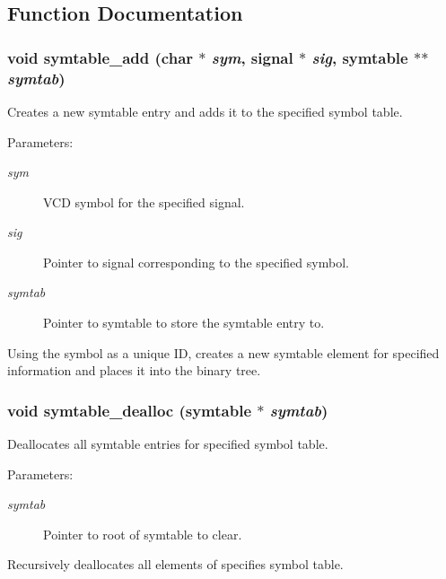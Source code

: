 \subsection{Function Documentation}
\subsubsection{\setlength{\rightskip}{0pt plus 5cm}void symtable\_\-add (char $\ast$ {\em sym}, {\bf signal} $\ast$ {\em sig}, {\bf symtable} $\ast$$\ast$ {\em symtab})}\label{symtable_8h_a0}


Creates a new symtable entry and adds it to the specified symbol table.

\begin{Desc}
\item[Parameters: ]\par
\begin{description}
\item[{\em 
sym}]VCD symbol for the specified signal. \item[{\em 
sig}]Pointer to signal corresponding to the specified symbol. \item[{\em 
symtab}]Pointer to symtable to store the symtable entry to.\end{description}
\end{Desc}
Using the symbol as a unique ID, creates a new symtable element for specified information and places it into the binary tree. 
\subsubsection{\setlength{\rightskip}{0pt plus 5cm}void symtable\_\-dealloc ({\bf symtable} $\ast$ {\em symtab})}\label{symtable_8h_a2}


Deallocates all symtable entries for specified symbol table.

\begin{Desc}
\item[Parameters: ]\par
\begin{description}
\item[{\em 
symtab}]Pointer to root of symtable to clear.\end{description}
\end{Desc}
Recursively deallocates all elements of specifies symbol table. 
